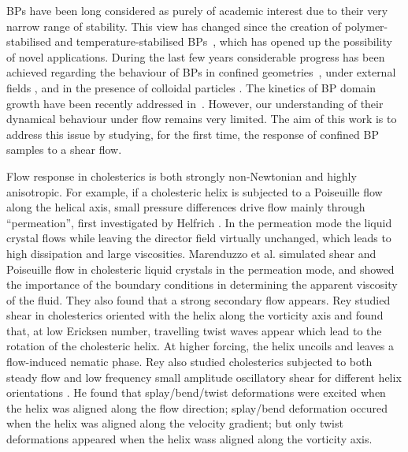 \documentclass[12pt,twoside]{iopart}
\begin{document}
BPs have been long considered as purely of academic interest due to their very narrow range of stability. This view has changed since the creation of
polymer-stabilised and temperature-stabilised BPs~\cite{Kikuchi:2002,Coles:2005}, which has opened up the possibility of novel applications.
During the last few years considerable progress has been achieved regarding the behaviour of BPs in confined geometries~\cite{Fukuda:2010a, Fukuda:2010b, Ravnik:2011b}, under external fields \cite{Alexander:2008,Fukuda:2009,Henrich:2010a,Castles:2010,Tiribocchi:2011}, and in the presence of colloidal particles \cite{Ravnik:2011a}. 
The kinetics of BP domain growth have been recently addressed in~\cite{Henrich:2010b}. However, our understanding of their dynamical behaviour under flow remains
very limited. The aim of this work is to address this issue by studying,
for the first time, the response of confined BP samples to a shear flow.

Flow response in cholesterics is both strongly non-Newtonian and highly anisotropic.
For example, if a cholesteric helix is subjected to a Poiseuille flow along
the helical axis, small pressure differences drive flow mainly through
``permeation'', first investigated by Helfrich \cite{Helfrich:1969}.
In the permeation mode the liquid crystal flows while leaving the director
field virtually unchanged, which leads to high dissipation and large
viscosities. Marenduzzo et al. \cite{Marenduzzo:2006a,Marenduzzo:2006b} simulated shear and Poiseuille flow in cholesteric liquid crystals in the permeation mode, and showed the importance of the boundary conditions in determining the apparent viscosity of the fluid. They also found that a strong secondary flow appears.
Rey \cite{Rey:1996a, Rey:1996b} studied shear in cholesterics oriented with the helix along the vorticity axis and found that, at low Ericksen number, travelling twist waves appear which lead to the rotation of the cholesteric helix. At higher forcing, the helix uncoils and leaves a flow-induced nematic phase. 
Rey also studied cholesterics subjected to both steady flow and low frequency
small amplitude oscillatory shear for different helix orientations
\cite{Rey:2000, Rey:2002}. He found that splay/bend/twist deformations were
excited when the helix was aligned along the flow direction; splay/bend
deformation occured when the helix was aligned along the velocity gradient;
but only twist deformations
appeared when the helix wass aligned along the vorticity axis.
\end{document}

